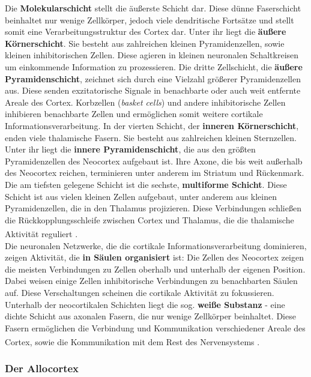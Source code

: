 \noindent Die \textbf{Molekularschicht} stellt die äußerste Schicht dar. Diese dünne Faserschicht beinhaltet nur wenige Zellkörper, jedoch viele dendritische Fortsätze und stellt somit eine Verarbeitungsstruktur des Cortex dar. Unter ihr liegt die \textbf{äußere Körnerschicht}. Sie besteht aus zahlreichen kleinen Pyramidenzellen, sowie kleinen inhibitorischen Zellen. Diese agieren in kleinen neuronalen Schaltkreisen um einkommende Information zu prozessieren. Die dritte Zellschicht, die \textbf{äußere Pyramidenschicht}, zeichnet sich durch eine Vielzahl größerer Pyramidenzellen aus. Diese senden exzitatorische Signale in benachbarte oder auch weit entfernte Areale des Cortex. Korbzellen (\textit{basket cells})  und andere inhibitorische Zellen inhibieren benachbarte Zellen und ermöglichen somit weitere cortikale Informationsverarbeitung. In der vierten Schicht, der \textbf{inneren Körnerschicht}, enden viele thalamische Fasern. Sie besteht aus zahlreichen kleinen Sternzellen. Unter ihr liegt die \textbf{innere Pyramidenschicht}, die aus den größten Pyramidenzellen des Neocortex aufgebaut ist. Ihre Axone, die bis weit außerhalb des Neocortex reichen, terminieren unter anderem im Striatum und Rückenmark. Die am tiefsten gelegene Schicht ist die sechste, \textbf{multiforme Schicht}. Diese Schicht ist aus vielen kleinen Zellen aufgebaut, unter anderem aus kleinen Pyramidenzellen, die in den Thalamus projizieren. Diese Verbindungen schließen die Rückkopplungsschleife zwischen Cortex und Thalamus, die die thalamische Aktivität reguliert \textsuperscript{\cite[Kap.~7]{watson2010thebrain}}.\\
Die neuronalen Netzwerke, die die cortikale Informationsverarbeitung dominieren, zeigen Aktivität, die \textbf{in Säulen organisiert} ist: Die Zellen des Neocortex zeigen die meisten Verbindungen zu Zellen oberhalb und unterhalb der eigenen Position. Dabei weisen einige Zellen inhibitorische Verbindungen zu benachbarten Säulen auf. Diese Verschaltungen scheinen die cortikale Aktivität zu fokussieren.\\
\noindent Unterhalb der neocortikalen Schichten liegt die sog. \textbf{weiße Substanz} - eine dichte Schicht aus axonalen Fasern, die nur wenige Zellkörper beinhaltet. Diese Fasern ermöglichen die Verbindung und Kommunikation verschiedener Areale des Cortex, sowie die Kommunikation mit dem Rest des Nervensystems \textsuperscript{\cite[Kap.~7]{watson2010thebrain}}.

\subsubsection*{Der Allocortex} 

